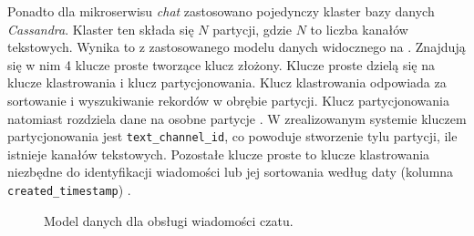Ponadto dla mikroserwisu \textit{chat} zastosowano pojedynczy klaster bazy danych \textit{Cassandra}. Klaster ten składa
się $N$ partycji, gdzie $N$ to liczba kanałów tekstowych. Wynika to z zastosowanego modelu danych widocznego na
. Znajdują się w nim 4 klucze proste tworzące klucz złożony. Klucze proste dzielą się
na klucze klastrowania i klucz partycjonowania. Klucz klastrowania odpowiada za sortowanie i wyszukiwanie rekordów w
obrębie partycji. Klucz partycjonowania natomiast rozdziela dane na osobne partycje \cite{bib:cassandra-data}. W
zrealizowanym systemie kluczem partycjonowania jest \verb|text_channel_id|, co powoduje stworzenie tylu partycji, ile
istnieje kanałów tekstowych. Pozostałe klucze proste to klucze klastrowania niezbędne do identyfikacji wiadomości lub
jej sortowania według daty (kolumna \verb|created_timestamp|) \cite{bib:cassandra-clustering}.
%
\begin{figure}[H]
  \centering
  \caption{Model danych dla obsługi wiadomości czatu.}
  \label{fig:chat-cassandra-model}
\end{figure}


